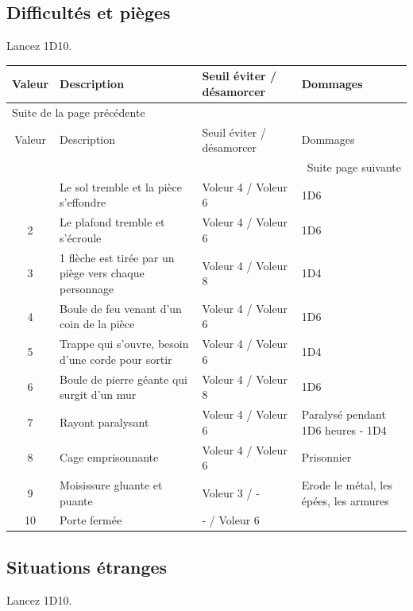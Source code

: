 \documentclass[a4paper, 11pt, twoside]{article}
\begin{document}
\subsection{Difficultés et pièges}
\label{sec:orgbd61bb3}

Lancez 1D10.

\begin{longtable}{c|p{6cm}|p{3.5cm}|p{4cm}}
Valeur & Description & Seuil éviter / désamorcer & Dommages\\
\hline
\endfirsthead
\multicolumn{4}{l}{Suite de la page précédente} \\
\hline

Valeur & Description & Seuil éviter / désamorcer & Dommages \\

\hline
\endhead
\hline\multicolumn{4}{r}{Suite page suivante} \\
\endfoot
\endlastfoot
\hline
1 & Le sol tremble et la pièce s'effondre & Voleur 4 / Voleur 6 & 1D6\\
2 & Le plafond tremble et s'écroule & Voleur 4 / Voleur 6 & 1D6\\
3 & 1 flèche est tirée par un piège vers chaque personnage & Voleur 4 / Voleur 8 & 1D4\\
4 & Boule de feu venant d'un coin de la pièce & Voleur 4 / Voleur 6 & 1D6\\
5 & Trappe qui s'ouvre, besoin d'une corde pour sortir & Voleur 4 / Voleur 6 & 1D4\\
6 & Boule de pierre géante qui surgit d'un mur & Voleur 4 / Voleur 8 & 1D6\\
7 & Rayont paralysant & Voleur 4 / Voleur 6 & Paralysé pendant 1D6 heures - 1D4\\
8 & Cage emprisonnante & Voleur 4 / Voleur 6 & Prisonnier\\
9 & Moisissure gluante et puante & Voleur 3 / - & Erode le métal, les épées, les armures\\
10 & Porte fermée & - / Voleur 6 & \\
\end{longtable}

\subsection{Situations étranges}
\label{sec:org0f09948}

Lancez 1D10.
\end{document}
